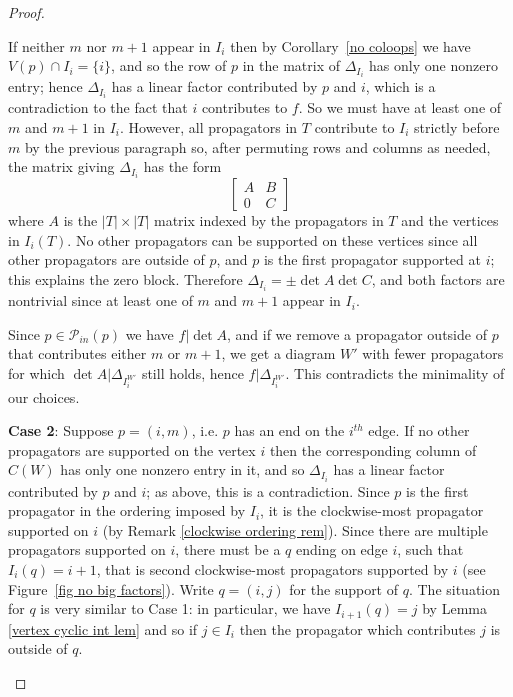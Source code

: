 \documentclass[11pt]{article}
\newcommand{\cP}{\mathcal{P}}
\theoremstyle{remark}
\theoremstyle{definition}
\begin{document}
\begin{proof}
\begin{enumerate}
If neither $m$ nor $m+1$ appear in $I_i$ then by Corollary~\ref{no coloops} we have $V(p) \cap I_i = \{i\}$, and so the row of $p$ in the matrix of $\Delta_{I_i}$ has only one nonzero entry; hence $\Delta_{I_i}$ has a linear factor contributed by $p$ and $i$, which is a contradiction to the fact that $i$ contributes to $f$.  So we must have at least one of $m$ and $m+1$ in $I_i$. However, all propagators in $T$ contribute to $I_{i}$ strictly before $m$ by the previous paragraph so, after permuting rows and columns as needed, the matrix giving $\Delta_{I_i}$ has the form
\[
\begin{bmatrix} A & B \\ 0 & C\end{bmatrix}
\]
where $A$ is the $|T|\times |T|$ matrix indexed by the propagators in $T$ and the vertices in $I_i(T)$. No other propagators can be supported on these vertices since all other propagators are outside of $p$, and $p$ is the first propagator supported at $i$; this explains the zero block.  Therefore $\Delta_{I_i} = \pm \det A \det C$, and both factors are nontrivial since at least one of $m$ and $m+1$ appear in $I_i$.  

Since $p\in \cP_{in}(p)$ we have $f|\det A$, and if we remove a propagator outside of $p$ that contributes either $m$ or $m+1$, we get a diagram $W'$ with fewer propagators for which $\det A | \Delta_{I^{W'}_i}$ still holds, hence $f|\Delta_{I^{W'}_i}$.  This contradicts the minimality of our choices. 

\textbf{Case 2}: Suppose $p = (i, m)$, i.e. $p$ has an end on the $i^{th}$ edge. If no other propagators are supported on the vertex $i$ then the corresponding column of $C(W)$ has only one nonzero entry in it, and so $\Delta_{I_i}$ has a linear factor contributed by $p$ and $i$; as above, this is a contradiction.
Since $p$ is the first propagator in the ordering imposed by $I_i$, it is the clockwise-most propagator supported on $i$ (by Remark {\ref{clockwise ordering rem}}). Since there are multiple propagators supported on $i$, there must be a $q$ ending on edge $i$, such that $I_i(q) = i+1$, that is second clockwise-most propagators supported by $i$ (see Figure~\ref{fig no big factors}).
Write $q = (i, j)$ for the support of $q$.  The situation for $q$ is very similar to Case 1: in particular, we have $I_{i+1}(q) = j$ by Lemma {\ref{vertex cyclic int lem}} and so if $j\in I_i$ then the propagator which contributes $j$ is outside of $q$.


\end{enumerate}
\end{proof}
\end{document}
